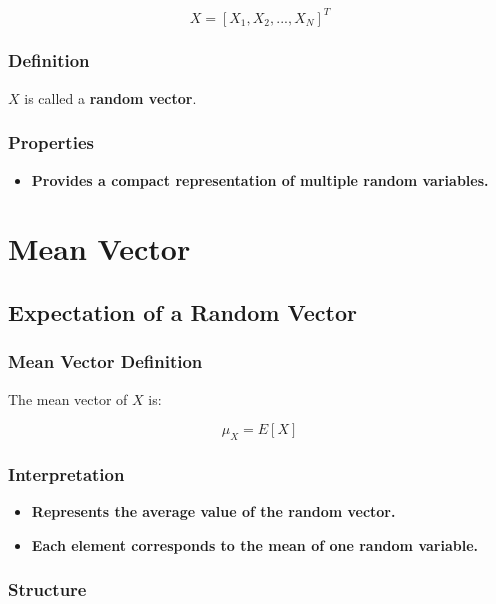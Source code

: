 \documentclass[12pt]{article}
\begin{document}
\[
\boxed{X = [X_1, X_2, ..., X_N]^T}
\]

\subsubsection*{\textbf{Definition}}

$X$ is called a \textbf{random vector}.

\subsubsection*{\textbf{Properties}}

\begin{itemize}
\item \textbf{Provides a compact representation of multiple random variables.}
\end{itemize}

\section{Mean Vector}

\subsection{Expectation of a Random Vector}

\subsubsection*{\textbf{Mean Vector Definition}}

The mean vector of $X$ is:

\[
\boxed{\mu_X = E[X]}
\]

\subsubsection*{\textbf{Interpretation}}

\begin{itemize}
\item \textbf{Represents the average value of the random vector.}
\item \textbf{Each element corresponds to the mean of one random variable.}
\end{itemize}

\subsubsection*{\textbf{Structure}}
\end{document}
